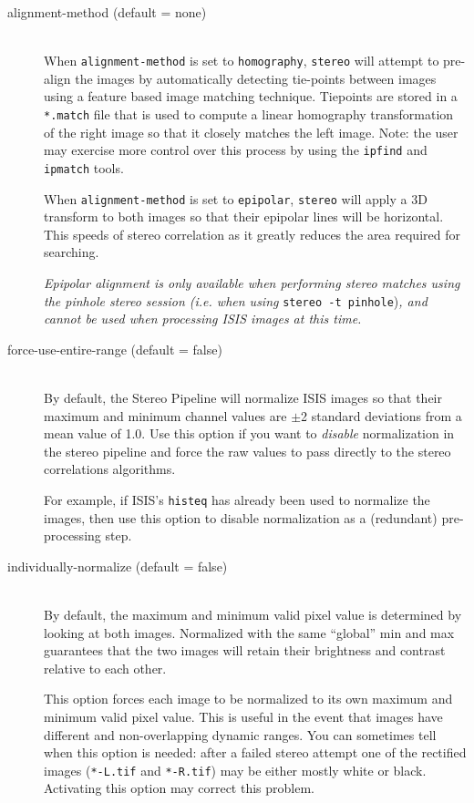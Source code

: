 \begin{description}

\item[alignment-method \textnormal (default = none)] \hfill \\
  When \texttt{alignment-method} is set to \texttt{homography},
  \texttt{stereo} will attempt to pre-align the images by
  automatically detecting tie-points between images using a feature
  based image matching technique. Tiepoints are stored in a
  \texttt{*.match} file that is used to compute a linear homography
  transformation of the right image so that it closely matches the
  left image.  Note: the user may exercise more control over this
  process by using the \texttt{ipfind} and \texttt{ipmatch} tools.

  When \texttt{alignment-method} is set to \texttt{epipolar},
  \texttt{stereo} will apply a 3D transform to both images so that
  their epipolar lines will be horizontal. This speeds of stereo
  correlation as it greatly reduces the area required for searching.

  {\em Epipolar alignment is only available when performing stereo
    matches using the pinhole stereo session (i.e. when using}
  \texttt{stereo -t pinhole}){\em, and cannot be used when processing
    ISIS images at this time.}

\item[force-use-entire-range \textnormal (default = false)] \hfill \\
  By default, the Stereo Pipeline will normalize ISIS images so that
  their maximum and minimum channel values are $\pm$2 standard
  deviations from a mean value of 1.0.  Use this option if you want to
  {\em disable} normalization in the stereo pipeline and force the raw
  values to pass directly to the stereo correlations algorithms.

  For example, if ISIS's \texttt{histeq} has already been used to
  normalize the images, then use this option to disable normalization
  as a (redundant) pre-processing step.


\item[individually-normalize \textnormal (default = false)] \hfill \\
  By default, the maximum and minimum valid pixel value is determined
  by looking at both images.  Normalized with the same ``global'' min
  and max guarantees that the two images will retain their brightness
  and contrast relative to each other.

  This option forces each image to be normalized to its own maximum
  and minimum valid pixel value. This is useful in the event that
  images have different and non-overlapping dynamic ranges. You can
  sometimes tell when this option is needed: after a failed stereo
  attempt one of the rectified images (\texttt{*-L.tif} and
  \texttt{*-R.tif}) may be either mostly white or black.  Activating
  this option may correct this problem.


\end{description}
